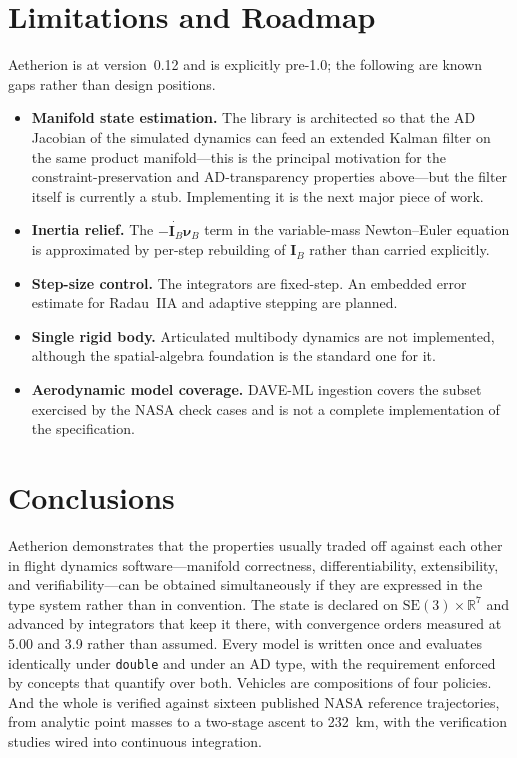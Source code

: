\documentclass[a4paper,10pt]{article}
\newcommand{\SE}{\mathrm{SE}(3)}
\newcommand{\R}{\mathbb{R}}
\newcommand{\nuB}{\boldsymbol{\nu}_B}
\newcommand{\IB}{\mathbf{I}_B}
\newcommand{\code}[1]{\texttt{\small #1}}
\theoremstyle{definition}
\begin{document}
\section{Limitations and Roadmap}
\label{sec:roadmap}

Aetherion is at version~0.12 and is explicitly pre-1.0; the following are known
gaps rather than design positions.

\begin{itemize}[leftmargin=*]
  \item \textbf{Manifold state estimation.}  The library is architected so that
    the AD Jacobian of the simulated dynamics can feed an extended Kalman
    filter on the same product manifold---this is the principal motivation for
    the constraint-preservation and AD-transparency properties above---but the
    filter itself is currently a stub.  Implementing it is the next major
    piece of work.
  \item \textbf{Inertia relief.}  The $-\dot{\IB}\nuB$ term in the
    variable-mass Newton--Euler equation is approximated by per-step rebuilding
    of $\IB$ rather than carried explicitly.
  \item \textbf{Step-size control.}  The integrators are fixed-step.  An
    embedded error estimate for Radau~IIA and adaptive stepping are planned.
  \item \textbf{Single rigid body.}  Articulated multibody dynamics are not
    implemented, although the spatial-algebra foundation is the standard one
    for it.
  \item \textbf{Aerodynamic model coverage.}  DAVE-ML ingestion covers the
    subset exercised by the NASA check cases and is not a complete
    implementation of the specification.
\end{itemize}

\section{Conclusions}
\label{sec:conclusions}

Aetherion demonstrates that the properties usually traded off against each
other in flight dynamics software---manifold correctness, differentiability,
extensibility, and verifiability---can be obtained simultaneously if they are
expressed in the type system rather than in convention.  The state is declared
on $\SE \times \R^7$ and advanced by integrators that keep it there, with
convergence orders measured at 5.00 and 3.9 rather than assumed.  Every model
is written once and evaluates identically under \code{double} and under an AD
type, with the requirement enforced by concepts that quantify over both.
Vehicles are compositions of four policies.  And the whole is verified against
sixteen published NASA reference trajectories, from analytic point masses to a
two-stage ascent to \SI{232}{\kilo\metre}, with the verification studies
wired into continuous integration.
\end{document}
